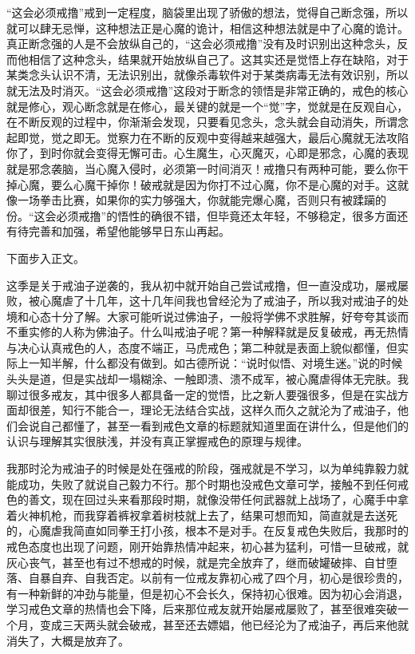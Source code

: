 \begin{case}
    “这会必须戒撸”戒到一定程度，脑袋里出现了骄傲的想法，觉得自己断念强，所以就可以肆无忌惮，这种想法正是心魔的诡计，相信这种想法就是中了心魔的诡计。真正断念强的人是不会放纵自己的，“这会必须戒撸”没有及时识别出这种念头，反而他相信了这种念头，结果就开始放纵自己了。这其实还是觉悟上存在缺陷，对于某类念头认识不清，无法识别出，就像杀毒软件对于某类病毒无法有效识别，所以就无法及时消灭。“这会必须戒撸”这段对于断念的领悟是非常正确的，戒色的核心就是修心，观心断念就是在修心，最关键的就是一个“觉”字，觉就是在反观自心，在不断反观的过程中，你渐渐会发现，只要看见念头，念头就会自动消失，所谓念起即觉，觉之即无。觉察力在不断的反观中变得越来越强大，最后心魔就无法攻陷你了，到时你就会变得无懈可击。心生魔生，心灭魔灭，心即是邪念，心魔的表现就是邪念袭脑，当心魔入侵时，必须第一时间消灭！戒撸只有两种可能，要么你干掉心魔，要么心魔干掉你！破戒就是因为你打不过心魔，你不是心魔的对手。这就像一场拳击比赛，如果你的实力够强大，你就能完爆心魔，否则只有被蹂躏的份。“这会必须戒撸”的悟性的确很不错，但毕竟还太年轻，不够稳定，很多方面还有待完善和加强，希望他能够早日东山再起。
\end{case}

下面步入正文。

这季是关于戒油子逆袭的，我从初中就开始自己尝试戒撸，但一直没成功，屡戒屡败，被心魔虐了十几年，这十几年间我也曾经沦为了戒油子，所以我对戒油子的处境和心态十分了解。大家可能听说过佛油子，一般将学佛不求胜解，好夸夸其谈而不重实修的人称为佛油子。什么叫戒油子呢？第一种解释就是反复破戒，再无热情与决心认真戒色的人，态度不端正，马虎戒色；第二种就是表面上貌似都懂，但实际上一知半解，什么都没有做到。如古德所说：“说时似悟、对境生迷。”说的时候头头是道，但是实战却一塌糊涂、一触即溃、溃不成军，被心魔虐得体无完肤。我聊过很多戒友，其中很多人都具备一定的觉悟，比之新人要强很多，但是在实战方面却很差，知行不能合一，理论无法结合实战，这样久而久之就沦为了戒油子，他们会说自己都懂了，甚至一看到戒色文章的标题就知道里面在讲什么，但是他们的认识与理解其实很肤浅，并没有真正掌握戒色的原理与规律。

我那时沦为戒油子的时候是处在强戒的阶段，强戒就是不学习，以为单纯靠毅力就能成功，失败了就说自己毅力不行。那个时期也没戒色文章可学，接触不到任何戒色的善文，现在回过头来看那段时期，就像没带任何武器就上战场了，心魔手中拿着火神机枪，而我穿着裤衩拿着树枝就上去了，结果可想而知，简直就是去送死的，心魔虐我简直如同拳王打小孩，根本不是对手。在反复戒色失败后，我那时的戒色态度也出现了问题，刚开始靠热情冲起来，初心甚为猛利，可惜一旦破戒，就灰心丧气，甚至也有过不想戒的时候，就是完全放弃了，继而破罐破摔、自甘堕落、自暴自弃、自我否定。以前有一位戒友靠初心戒了四个月，初心是很珍贵的，有一种新鲜的冲劲与能量，但是初心不会长久，保持初心很难。因为初心会消退，学习戒色文章的热情也会下降，后来那位戒友就开始屡戒屡败了，甚至很难突破一个月，变成三天两头就会破戒，甚至还去嫖娼，他已经沦为了戒油子，再后来他就消失了，大概是放弃了。

